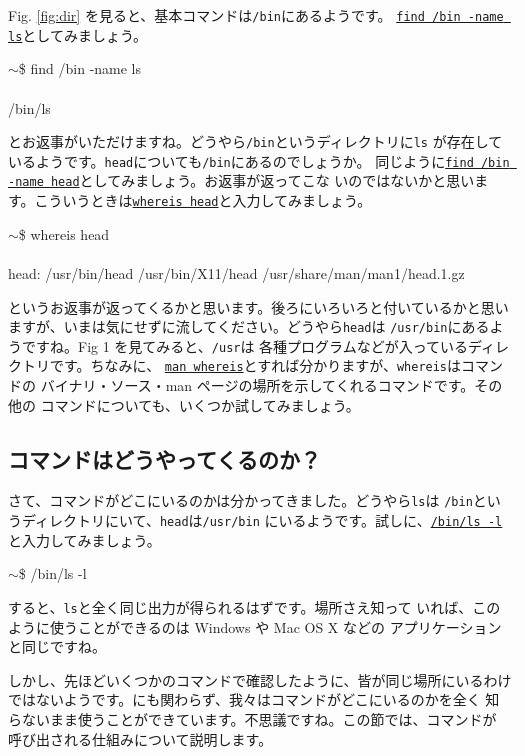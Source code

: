 \documentclass[a4j]{ltjreport}
\begin{document}
    Fig. \ref{fig:dir} を見ると、基本コマンドは\verb+/bin+にあるようです。
    \underline{\texttt{find /bin -name ls}}としてみましょう。
    \begin{screen}
        $\sim$\$ find  /bin  -name  ls\\
        \\
        /bin/ls
    \end{screen}
    とお返事がいただけますね。どうやら\verb+/bin+というディレクトリに\verb+ls+
    が存在しているようです。\verb+head+についても\verb+/bin+にあるのでしょうか。
    同じように\underline{\texttt{find /bin -name head}}としてみましょう。お返事が返ってこな
    いのではないかと思います。こういうときは\underline{\texttt{whereis head}}と入力してみましょう。
    \begin{screen}
        $\sim$\$ whereis  head \\
        \\
        head: /usr/bin/head /usr/bin/X11/head /usr/share/man/man1/head.1.gz
    \end{screen}
    というお返事が返ってくるかと思います。後ろにいろいろと付いているかと思い
    ますが、いまは気にせずに流してください。どうやら\verb+head+は
    \verb+/usr/bin+にあるようですね。Fig 1 を見てみると、\verb+/usr+は
    各種プログラムなどが入っているディレクトリです。ちなみに、
    \underline{\texttt{man whereis}}とすれば分かりますが、\verb+whereis+はコマンドの
    バイナリ・ソース・man ページの場所を示してくれるコマンドです。その他の
    コマンドについても、いくつか試してみましょう。

    \subsection{コマンドはどうやってくるのか？}
    さて、コマンドがどこにいるのかは分かってきました。どうやら\verb+ls+は
    \verb+/bin+というディレクトリにいて、\verb+head+は\verb+/usr/bin+
    にいるようです。試しに、\underline{\texttt{/bin/ls -l}}と入力してみましょう。
    \begin{screen}
        $\sim$\$ /bin/ls  -l 
    \end{screen}

    すると、\verb+ls+と全く同じ出力が得られるはずです。場所さえ知って
    いれば、このように使うことができるのは Windows や Mac OS X などの
    アプリケーションと同じですね。

    しかし、先ほどいくつかのコマンドで確認したように、皆が同じ場所にいるわけ
    ではないようです。にも関わらず、我々はコマンドがどこにいるのかを全く
    知らないまま使うことができています。不思議ですね。この節では、コマンドが
    呼び出される仕組みについて説明します。
\end{document}

